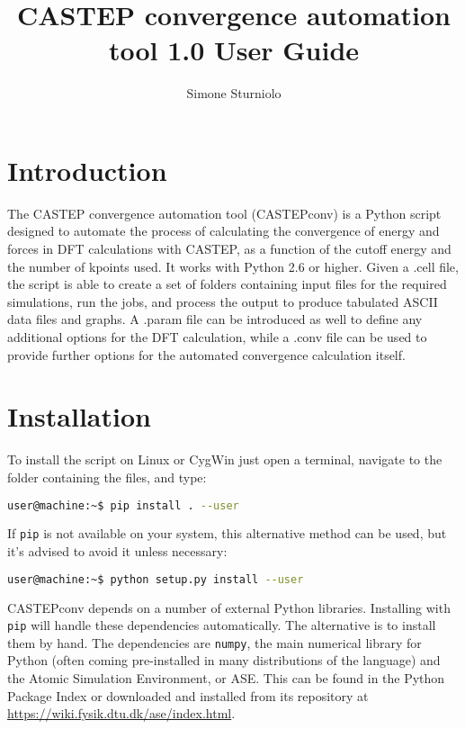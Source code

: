 \documentclass[10pt]{article}
\title{CASTEP convergence automation tool 1.0 User Guide}
\author{Simone Sturniolo}
\begin{document}
\maketitle

\section{Introduction}

The CASTEP convergence automation tool (CASTEPconv) is a Python script designed 
to automate the process of calculating the convergence of energy and forces in 
DFT calculations with CASTEP, as a function of the cutoff energy and the number 
of kpoints used. It works with Python 2.6 or higher. Given a .cell file, the 
script is able to create a set of folders containing input files for the 
required simulations, run the jobs, and process the output to produce tabulated 
ASCII data files and graphs. A .param file can be introduced as well to define 
any additional options for the DFT calculation, while a .conv file can be used 
to provide further options for the automated convergence calculation itself.

\section{Installation}

To install the script on Linux or CygWin just open a terminal, navigate to the 
folder containing the files, and type:

\begin{lstlisting}[language=Bash]
 user@machine:~$ pip install . --user
\end{lstlisting}

If \texttt{pip} is not available on your system, this alternative method can be
used, but it's advised to avoid it unless necessary:

\begin{lstlisting}[language=Bash]
 user@machine:~$ python setup.py install --user
\end{lstlisting}

CASTEPconv depends on a number of external Python libraries. Installing with 
\texttt{pip} will handle these dependencies automatically. The alternative is
to install them by hand. The dependencies are \texttt{numpy}, the main numerical
library for Python (often coming pre-installed in many distributions of the
language) and the Atomic Simulation Environment, or ASE. This can be found in
the Python Package Index or downloaded and installed from its repository at
\url{https://wiki.fysik.dtu.dk/ase/index.html}.
\end{document}
